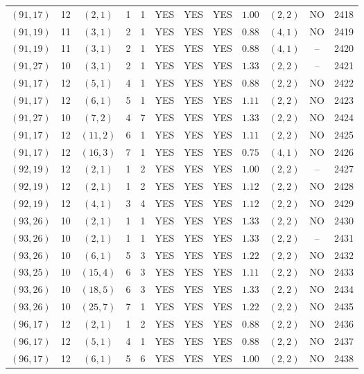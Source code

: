 \begin{longtable}{|c|c|c|c|c|c|c|c|c|c|c|c|}
$(91,17)$ & 12 & $(2,1)$ & 1 & 1 & YES & YES & YES & $1.00$ & $(2,2)$ & NO & 2418\\
$(91,19)$ & 11 & $(3,1)$ & 2 & 1 & YES & YES & YES & $0.88$ & $(4,1)$ & NO & 2419\\
$(91,19)$ & 11 & $(3,1)$ & 2 & 1 & YES & YES & YES & $0.88$ & $(4,1)$ & -- & 2420\\
$(91,27)$ & 10 & $(3,1)$ & 2 & 1 & YES & YES & YES & $1.33$ & $(2,2)$ & -- & 2421\\
$(91,17)$ & 12 & $(5,1)$ & 4 & 1 & YES & YES & YES & $0.88$ & $(2,2)$ & NO & 2422\\
$(91,17)$ & 12 & $(6,1)$ & 5 & 1 & YES & YES & YES & $1.11$ & $(2,2)$ & NO & 2423\\
$(91,27)$ & 10 & $(7,2)$ & 4 & 7 & YES & YES & YES & $1.33$ & $(2,2)$ & NO & 2424\\
$(91,17)$ & 12 & $(11,2)$ & 6 & 1 & YES & YES & YES & $1.11$ & $(2,2)$ & NO & 2425\\
$(91,17)$ & 12 & $(16,3)$ & 7 & 1 & YES & YES & YES & $0.75$ & $(4,1)$ & NO & 2426\\
$(92,19)$ & 12 & $(2,1)$ & 1 & 2 & YES & YES & YES & $1.00$ & $(2,2)$ & -- & 2427\\
$(92,19)$ & 12 & $(2,1)$ & 1 & 2 & YES & YES & YES & $1.12$ & $(2,2)$ & NO & 2428\\
$(92,19)$ & 12 & $(4,1)$ & 3 & 4 & YES & YES & YES & $1.12$ & $(2,2)$ & NO & 2429\\
$(93,26)$ & 10 & $(2,1)$ & 1 & 1 & YES & YES & YES & $1.33$ & $(2,2)$ & NO & 2430\\
$(93,26)$ & 10 & $(2,1)$ & 1 & 1 & YES & YES & YES & $1.33$ & $(2,2)$ & -- & 2431\\
$(93,26)$ & 10 & $(6,1)$ & 5 & 3 & YES & YES & YES & $1.22$ & $(2,2)$ & NO & 2432\\
$(93,25)$ & 10 & $(15,4)$ & 6 & 3 & YES & YES & YES & $1.11$ & $(2,2)$ & NO & 2433\\
$(93,26)$ & 10 & $(18,5)$ & 6 & 3 & YES & YES & YES & $1.33$ & $(2,2)$ & NO & 2434\\
$(93,26)$ & 10 & $(25,7)$ & 7 & 1 & YES & YES & YES & $1.22$ & $(2,2)$ & NO & 2435\\
$(96,17)$ & 12 & $(2,1)$ & 1 & 2 & YES & YES & YES & $0.88$ & $(2,2)$ & NO & 2436\\
$(96,17)$ & 12 & $(5,1)$ & 4 & 1 & YES & YES & YES & $0.88$ & $(2,2)$ & NO & 2437\\
$(96,17)$ & 12 & $(6,1)$ & 5 & 6 & YES & YES & YES & $1.00$ & $(2,2)$ & NO & 2438\\

\end{longtable}
